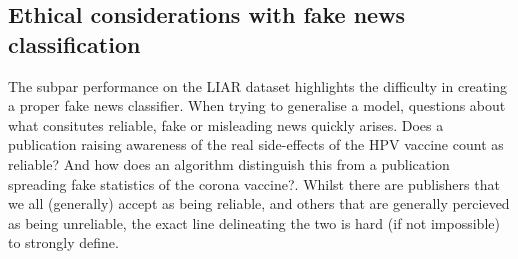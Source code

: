 \subsection{Ethical considerations with fake news classification}
The subpar performance on the LIAR dataset highlights the difficulty in creating a proper fake news classifier. When trying to
generalise a model, questions about what consitutes reliable, fake or misleading news quickly arises. Does a publication raising awareness
of the real side-effects of the HPV vaccine count as reliable? And how does an algorithm distinguish this from a
publication spreading fake statistics of the corona vaccine?. Whilst there are publishers that we all (generally)
accept as being reliable, and others that are generally percieved as being unreliable, the exact line delineating the
two is hard (if not impossible) to strongly define.
\newpage
